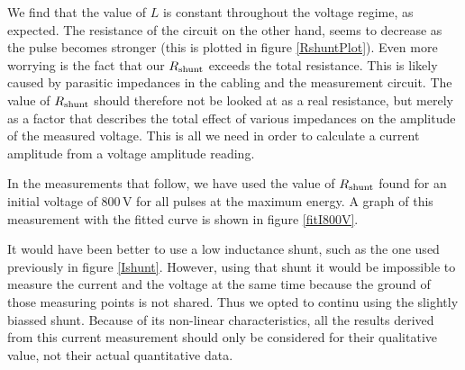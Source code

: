 We find that the value of $L$ is constant throughout the voltage regime, as 
expected. The resistance of the circuit on the other hand, seems to 
decrease as the pulse becomes stronger (this is plotted in figure 
\ref{RshuntPlot}).  Even more worrying is the fact that our $R_\mathrm{shunt}$ 
exceeds the total resistance.  This is likely caused by parasitic 
impedances in the cabling and the measurement circuit.  The value of 
$R_\mathrm{shunt}$ should therefore not be looked at as a real resistance, but 
merely as a factor that describes the total effect of various impedances on 
the amplitude of the measured voltage. This is all we need in order to 
calculate a current amplitude from a voltage amplitude reading.


In the measurements that follow, we have used the value of $R_\mathrm{shunt}$ found 
for an initial voltage of 800\,V for all pulses at the maximum energy.
A graph of this measurement with the fitted curve is shown in figure 
\ref{fitI800V}.



It would have been better to use a low inductance shunt, such as the one 
used previously in figure \ref{Ishunt}. However, using that shunt it would 
be impossible to measure the current and the voltage at the same time 
because the ground of those measuring points is not shared. Thus we opted 
to continu using the slightly biassed shunt. Because of its non-linear 
characteristics, all the results derived from this current measurement 
should only be considered for their qualitative value, not their actual 
quantitative data.

